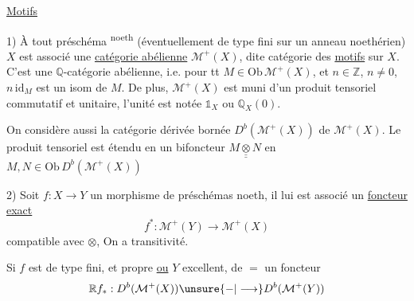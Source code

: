 \uline{Motifs} %

1) À tout préschéma \textsuperscript{noeth} (éventuellement de type fini sur un anneau %
noethérien) $X$ est associé une \uline{catégorie abélienne} %
$\mathcal M^+(X)$, dite catégorie des \uline{motifs}  sur $X$. C'est une %
$\mathbb Q$-catégorie  abélienne, i.e. pour tt %
$M\in\mathrm{Ob}\,\mathcal M^+(X)$, et $n\in\mathbb Z$, $n\ne0$, $n\,\mathrm{id}_M$ est un isom %
de $M$. De plus, $\mathcal M^+(X)$ est muni d'un %
produit tensoriel commutatif et unitaire,  %
l'unité est notée $\mathbb 1_X$ ou $\mathbb Q_X(0)$. %

On considère aussi la catégorie dérivée bornée %
$D^b(\mathcal M^+(X))$ de $\mathcal M^+(X)$. Le produit tensoriel est %
étendu en un bifoncteur $M\mathbin{\underline{\underline{\otimes}}}N$ en $M,N\in\mathrm{Ob}\,D^b(\mathcal M^+(X))$ %

2) Soit $f:X\longrightarrow Y$ un morphisme de préschémas %
 noeth, il lui est associé un \uline{foncteur} %
\uline{exact} %
\[
f^*:\mathcal M^+(Y)\longrightarrow\mathcal M^+(X) %
\]
compatible avec $\otimes$,  On a transitivité. %

Si $f$ est de type fini, et propre \uline{ou} $Y$ excellent, %
  de $=$ un foncteur %
\[
\mathbb R f_*:D^b(\mathcal M^+(X))\unsure{-|\longrightarrow}D^b(\mathcal M^+(Y)) %
\]

